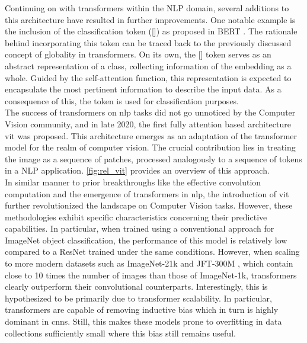 \noindent Continuing on with transformers within the NLP domain, several additions 
to this architecture have resulted in further improvements. One notable example is the inclusion of 
the classification token ([]) as proposed in BERT \autocite{devlin2018bert}. The rationale 
behind incorporating this token can be traced back to the previously discussed concept of globality 
in transformers. On its own, the [] token serves as an abstract representation of a 
class, collecting information of the embedding as a whole. Guided by the 
self-attention function, this representation is expected to encapsulate the most pertinent 
information to describe the input data. As a consequence of this, the  token is used for 
classification purposes.\\

\noindent The success of transformers on \gls{nlp} tasks did not go unnoticed by the Computer Vision 
community, and in late 2020, the first fully attention based architecture \gls{vit} was proposed.
This architecture emerges as an adaptation of the transformer model for the realm of computer vision. 
The crucial contribution lies in treating the image as a sequence of patches, processed 
analogously to a sequence of tokens in a NLP application. \autoref{fig:rel_vit} provides an 
overview of this approach.\\


\noindent In similar manner to prior breakthroughs like the effective convolution computation and the 
emergence of transformers in \gls{nlp}, the introduction of \gls{vit} further revolutionized the 
landscape on Computer Vision tasks. However, these methodologies exhibit specific characteristics 
concerning their predictive capabilities. In particular, when trained using a conventional 
approach for ImageNet object classification, the performance of this model is relatively low 
compared to a ResNet trained under the same conditions. However, when scaling to more modern 
datasets such as ImageNet-21k and JFT-300M \autocite{sun2017revisiting}, which contain close to 10 
times the number of images than those of ImageNet-1k, transformers clearly outperform their 
convolutional counterparts. Interestingly, this is hypothesized to be primarily due to transformer 
scalability. In particular, transformers are capable of removing inductive bias 
which in turn is highly dominant in \glspl{cnn}. Still, this makes these models prone to overfitting 
in data collections sufficiently small where this bias still remains useful.\\

